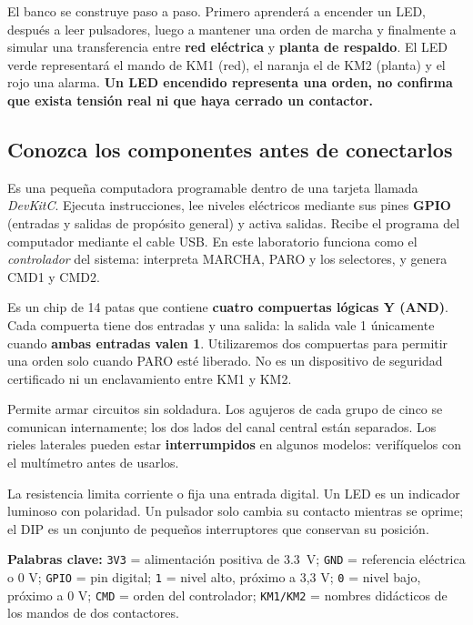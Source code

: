 \documentclass[11pt,a4paper]{article}
\newcommand{\sig}[1]{\texttt{#1}}
\begin{document}
El banco se construye paso a paso. Primero aprenderá a encender un LED, después a leer pulsadores, luego a mantener una orden de marcha y finalmente a simular una transferencia entre \textbf{red eléctrica} y \textbf{planta de respaldo}. El LED verde representará el mando de KM1 (red), el naranja el de KM2 (planta) y el rojo una alarma. \textbf{Un LED encendido representa una orden, no confirma que exista tensión real ni que haya cerrado un contactor.}

\subsection*{Conozca los componentes antes de conectarlos}

\begin{description}[style=nextline,leftmargin=1.2cm,topsep=3pt,itemsep=3pt]
 \item[ESP32 (microcontrolador).] Es una pequeña computadora programable dentro de una tarjeta llamada \emph{DevKitC}. Ejecuta instrucciones, lee niveles eléctricos mediante sus pines \textbf{GPIO} (entradas y salidas de propósito general) y activa salidas. Recibe el programa del computador mediante el cable USB. En este laboratorio funciona como el \emph{controlador} del sistema: interpreta MARCHA, PARO y los selectores, y genera CMD1 y CMD2.
 \item[74HC08 (circuito integrado).] Es un chip de 14 patas que contiene \textbf{cuatro compuertas lógicas Y (AND)}. Cada compuerta tiene dos entradas y una salida: la salida vale 1 únicamente cuando \textbf{ambas entradas valen 1}. Utilizaremos dos compuertas para permitir una orden solo cuando PARO esté liberado. No es un dispositivo de seguridad certificado ni un enclavamiento entre KM1 y KM2.
 \item[Protoboard (placa de pruebas).] Permite armar circuitos sin soldadura. Los agujeros de cada grupo de cinco se comunican internamente; los dos lados del canal central están separados. Los rieles laterales pueden estar \textbf{interrumpidos} en algunos modelos: verifíquelos con el multímetro antes de usarlos.
 \item[Resistencias, LED, pulsadores y DIP.] La resistencia limita corriente o fija una entrada digital. Un LED es un indicador luminoso con polaridad. Un pulsador solo cambia su contacto mientras se oprime; el DIP es un conjunto de pequeños interruptores que conservan su posición.
\end{description}

\begin{clave}
\textbf{Palabras clave:} \sig{3V3} = alimentación positiva de \SI{3,3}{V}; \sig{GND} = referencia eléctrica o 0 V; \sig{GPIO} = pin digital; \sig{1} = nivel alto, próximo a 3,3 V; \sig{0} = nivel bajo, próximo a 0 V; \sig{CMD} = orden del controlador; \sig{KM1/KM2} = nombres didácticos de los mandos de dos contactores.
\end{clave}
\end{document}
